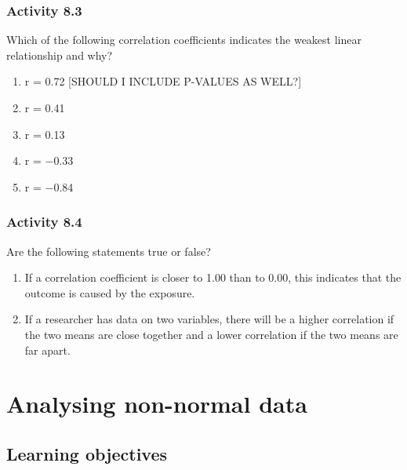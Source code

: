 \documentclass[
]{memoir}
\providecommand{\tightlist}{%
  \setlength{\itemsep}{0pt}\setlength{\parskip}{0pt}}
\begin{document}
\hypertarget{activity-8.3}{%
\subsection*{Activity 8.3}\label{activity-8.3}}

Which of the following correlation coefficients indicates the weakest linear relationship and why?

\begin{enumerate}
\def\labelenumi{\alph{enumi})}
\tightlist
\item
  r = 0.72 {[}SHOULD I INCLUDE P-VALUES AS WELL?{]}
\item
  r = 0.41
\item
  r = 0.13
\item
  r = −0.33
\item
  r = −0.84
\end{enumerate}

\hypertarget{activity-8.4}{%
\subsection*{Activity 8.4}\label{activity-8.4}}

Are the following statements true or false?

\begin{enumerate}
\def\labelenumi{\alph{enumi})}
\tightlist
\item
  If a correlation coefficient is closer to 1.00 than to 0.00, this indicates that the outcome is caused by the exposure.
\item
  If a researcher has data on two variables, there will be a higher correlation if the two means are close together and a lower correlation if the two means are far apart.
\end{enumerate}

\hypertarget{analysing-non-normal-data}{%
\chapter{Analysing non-normal data}\label{analysing-non-normal-data}}

\hypertarget{learning-objectives-8}{%
\section*{Learning objectives}\label{learning-objectives-8}}
\end{document}
